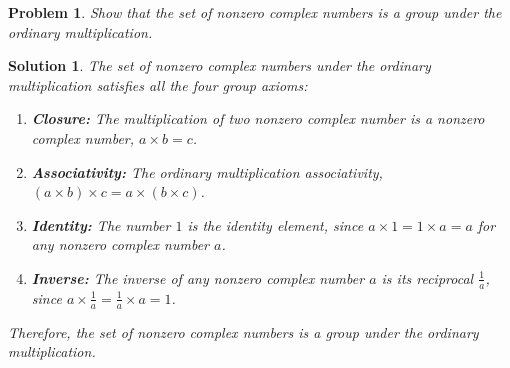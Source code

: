 \documentclass[UTF8,10pt,a4paper]{article}
\theoremstyle{Problem}
\newtheorem{prob}{Problem}
\theoremstyle{Solution}
\newtheorem*{sol}{Solution}
\begin{document}
\begin{prob}
    Show that the set of nonzero complex numbers is a group under the ordinary multiplication.
\end{prob}
\begin{sol}
    The set of nonzero complex numbers under the ordinary multiplication satisfies all the four group axioms:
    \begin{enumerate}
        \item \textbf{Closure:} The multiplication of two nonzero complex number is a nonzero complex number, $a\times b=c$.
        \item \textbf{Associativity:} The ordinary multiplication associativity, $(a\times b)\times c=a\times(b\times c)$.
        \item \textbf{Identity:} The number $1$ is the identity element, since $a\times 1=1\times a=a$ for any nonzero complex number $a$.
        \item \textbf{Inverse:} The inverse of any nonzero complex number $a$ is its reciprocal $\frac{1}{a}$, since $a\times\frac{1}{a}=\frac{1}{a}\times a=1$.
    \end{enumerate}
    Therefore, the set of nonzero complex numbers is a group under the ordinary multiplication.
\end{sol}
\end{document}
